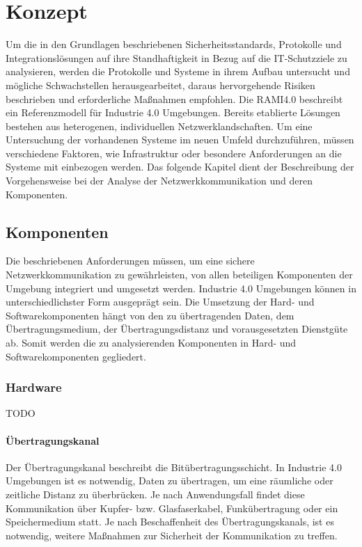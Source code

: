 \chapter{Konzept}
Um die in den Grundlagen beschriebenen Sicherheitsstandards, Protokolle und Integrationslösungen auf ihre Standhaftigkeit in Bezug auf die IT-Schutzziele zu analysieren, werden die Protokolle und Systeme in ihrem Aufbau untersucht und mögliche Schwachstellen herausgearbeitet, daraus hervorgehende Risiken beschrieben und erforderliche Maßnahmen empfohlen. Die \ac{RAMI4.0} beschreibt ein Referenzmodell für Industrie 4.0 Umgebungen. Bereits etablierte Lösungen bestehen aus heterogenen, individuellen Netzwerklandschaften. Um eine Untersuchung der vorhandenen Systeme im neuen Umfeld durchzuführen, müssen verschiedene Faktoren, wie Infrastruktur oder besondere Anforderungen an die Systeme mit einbezogen werden. Das folgende Kapitel dient der Beschreibung der Vorgehensweise bei der Analyse der Netzwerkkommunikation und deren Komponenten.

\section{Komponenten}
Die beschriebenen Anforderungen müssen, um eine sichere Netzwerkkommunikation zu gewährleisten, von allen beteiligen Komponenten der Umgebung integriert und umgesetzt werden. Industrie 4.0 Umgebungen können in unterschiedlichster Form ausgeprägt sein. Die Umsetzung der Hard- und Softwarekomponenten hängt von den zu übertragenden Daten, dem Übertragungsmedium, der Übertragungsdistanz und vorausgesetzten Dienstgüte ab. Somit werden die zu analysierenden Komponenten in Hard- und Softwarekomponenten gegliedert.

\subsection{Hardware}
TODO

\subsubsection{Übertragungskanal}
Der Übertragungskanal beschreibt die Bitübertragungsschicht. In Industrie 4.0 Umgebungen ist es notwendig, Daten zu übertragen, um eine räumliche oder zeitliche Distanz zu überbrücken. Je nach Anwendungsfall findet diese Kommunikation über Kupfer- bzw. Glasfaserkabel, Funkübertragung oder ein Speichermedium statt. Je nach Beschaffenheit des Übertragungskanals, ist es notwendig, weitere Maßnahmen zur Sicherheit der Kommunikation zu treffen. 

